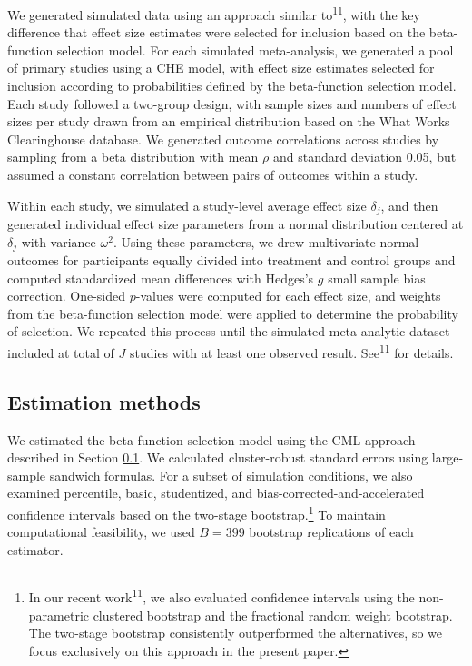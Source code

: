 \documentclass[
  american,
  man, donotrepeattitle,floatsintext]{apa7}
\begin{document}
We generated simulated data using an approach similar to\textsuperscript{11}, with the key difference that effect size estimates were selected for inclusion based on the beta-function selection model. For each simulated meta-analysis, we generated a pool of primary studies using a CHE model, with effect size estimates selected for inclusion according to probabilities defined by the beta-function selection model. Each study followed a two-group design, with sample sizes and numbers of effect sizes per study drawn from an empirical distribution based on the What Works Clearinghouse database. We generated outcome correlations across studies by sampling from a beta distribution with mean \(\rho\) and standard deviation 0.05, but assumed a constant correlation between pairs of outcomes within a study.

Within each study, we simulated a study-level average effect size \(\delta_j\), and then generated individual effect size parameters from a normal distribution centered at \(\delta_j\) with variance \(\omega^2\). Using these parameters, we drew multivariate normal outcomes for participants equally divided into treatment and control groups and computed standardized mean differences with Hedges's \(g\) small sample bias correction. One-sided \(p\)-values were computed for each effect size, and weights from the beta-function selection model were applied to determine the probability of selection. We repeated this process until the simulated meta-analytic dataset included at total of \(J\) studies with at least one observed result. See\textsuperscript{11} for details.

\subsection{Estimation methods}\label{estimation-methods}

We estimated the beta-function selection model using the CML approach described in Section \ref{estimation-methods}. We calculated cluster-robust standard errors using large-sample sandwich formulas. For a subset of simulation conditions, we also examined percentile, basic, studentized, and bias-corrected-and-accelerated confidence intervals based on the two-stage bootstrap.\footnote{In our recent work\textsuperscript{11}, we also evaluated confidence intervals using the non-parametric clustered bootstrap and the fractional random weight bootstrap. The two-stage bootstrap consistently outperformed the alternatives, so we focus exclusively on this approach in the present paper.} To maintain computational feasibility, we used \(B = 399\) bootstrap replications of each estimator.
\end{document}
